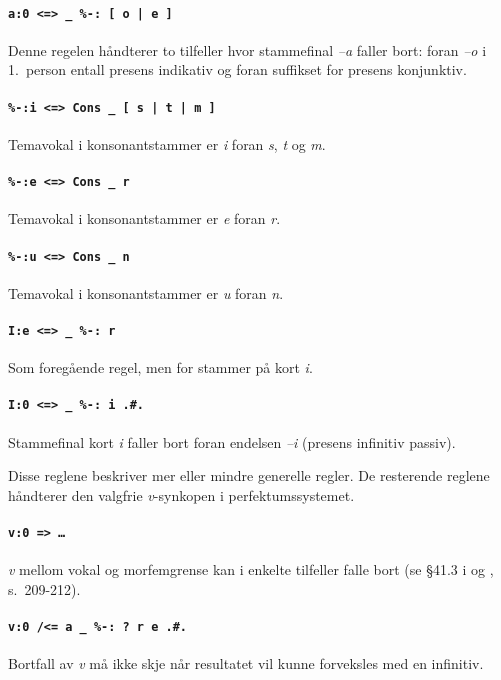 \documentclass{article}
\let\code\texttt
\let\w\emph
\begin{document}
\paragraph{\code{a:0 <=> \_ \%-: [ o | e ]}} Denne regelen h\aa{}ndterer to
tilfeller hvor stammefinal \w{--a} faller bort: foran \w{--o} i 1.~person
entall presens indikativ og foran suffikset for presens konjunktiv.

\paragraph{\code{\%-:i <=> Cons \_ [ s | t | m ]}} Temavokal i
konsonantstammer er \w{i} foran \w{s}, \w{t} og \w{m}.

\paragraph{\code{\%-:e <=> Cons \_ r}} Temavokal i konsonantstammer er
\w{e} foran \w{r}.

\paragraph{\code{\%-:u <=> Cons \_ n}} Temavokal i konsonantstammer er
\w{u} foran \w{n}.

\paragraph{\code{I:e <=> \_ \%-: r}} Som foreg\aa{}ende regel, men for
stammer p\aa{} kort \w{i}.

\paragraph{\code{I:0 <=> \_ \%-: i .\#.}} Stammefinal kort \w{i} faller bort
foran endelsen \w{--i} (presens infinitiv passiv).

Disse reglene beskriver mer eller mindre generelle regler. De resterende
reglene h\aa{}ndterer den valgfrie \w{v}-synkopen i perfektumssystemet.

\paragraph{\code{v:0 => \ldots}} \w{v} mellom vokal og morfemgrense kan i
enkelte tilfeller falle bort (se \S 41.3 i  og ,
s.~209-212).

\paragraph{\code{v:0 /<= a \_ \%-: ? r e .\#.}} Bortfall av \w{v} m\aa{}
ikke skje n\aa{}r resultatet vil kunne forveksles med en infinitiv.
\end{document}
